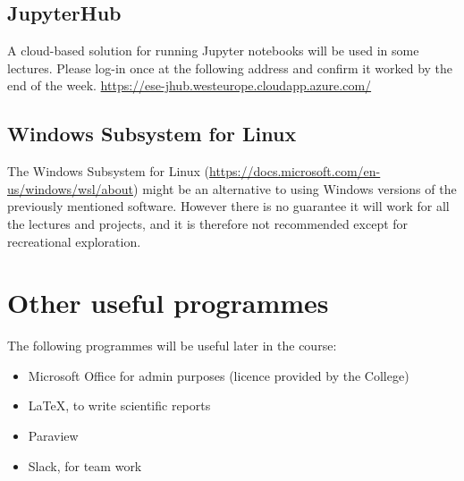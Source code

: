 \documentclass[11pt]{article}
\begin{document}
\subsection{JupyterHub}

A cloud-based solution for running Jupyter notebooks will be used in some lectures. Please log-in once at the following address and confirm it worked by the end of the week.
\url{https://ese-jhub.westeurope.cloudapp.azure.com/}


\subsection{Windows Subsystem for Linux}

The Windows Subsystem for Linux (\url{https://docs.microsoft.com/en-us/windows/wsl/about}) might be an alternative to using Windows versions of the previously mentioned software. 
However there is no guarantee it will work for all the lectures and projects, and it is therefore not recommended except for recreational exploration.


\section{Other useful programmes}

The following programmes will be useful later in the course:
\begin{itemize}
  \item Microsoft Office for admin purposes (licence provided by the College)
  \item LaTeX, to write scientific reports
  \item Paraview
  \item Slack, for team work
\end{itemize}
\end{document}
